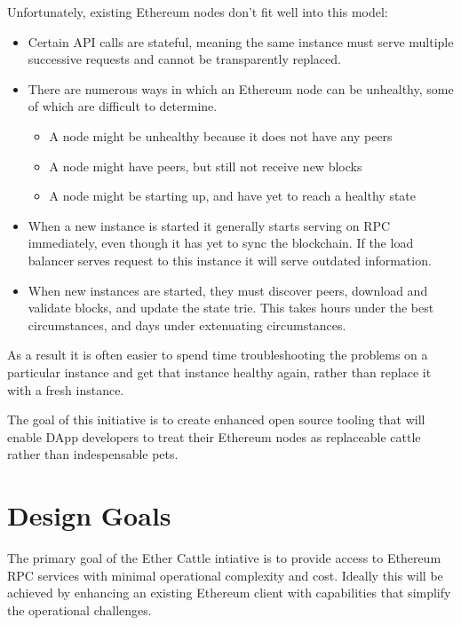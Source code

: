 \documentclass[letterpaper,10pt,english]{sphinxmanual}
\begin{document}
Unfortunately, existing Ethereum nodes don’t fit well into this model:
\begin{itemize}
\item {} 
Certain API calls are stateful, meaning the same instance must serve multiple
successive requests and cannot be transparently replaced.

\item {} 
There are numerous ways in which an Ethereum node can be unhealthy, some of
which are difficult to determine.
\begin{itemize}
\item {} 
A node might be unhealthy because it does not have any peers

\item {} 
A node might have peers, but still not receive new blocks

\item {} 
A node might be starting up, and have yet to reach a healthy state

\end{itemize}

\item {} 
When a new instance is started it generally starts serving on RPC
immediately, even though it has yet to sync the blockchain. If the load
balancer serves request to this instance it will serve outdated information.

\item {} 
When new instances are started, they must discover peers, download and
validate blocks, and update the state trie. This takes hours under the best
circumstances, and days under extenuating circumstances.

\end{itemize}

As a result it is often easier to spend time troubleshooting the problems on a
particular instance and get that instance healthy again, rather than replace it
with a fresh instance.

The goal of this initiative is to create enhanced open source tooling that will
enable DApp developers to treat their Ethereum nodes as replaceable cattle
rather than indespensable pets.


\chapter{Design Goals}
\label{\detokenize{topics/goals::doc}}\label{\detokenize{topics/goals:design-goals}}\label{\detokenize{topics/goals:id1}}
The primary goal of the Ether Cattle intiative is to provide access to Ethereum
RPC services with minimal operational complexity and cost. Ideally this will
be achieved by enhancing an existing Ethereum client with capabilities that
simplify the operational challenges.
\end{document}
